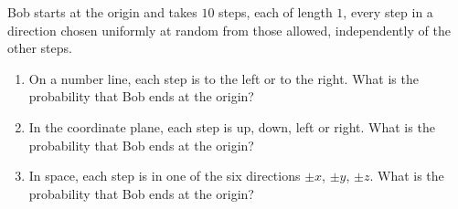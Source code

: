 Bob starts at the origin and takes $10$ steps, each of length $1$, every step in a direction chosen uniformly at random from those allowed, independently of the other steps.
\begin{enumerate}
\item[(a)] On a number line, each step is to the left or to the right. What is the probability that Bob ends at the origin?
\item[(b)] In the coordinate plane, each step is up, down, left or right. What is the probability that Bob ends at the origin?
\item[(c)] In space, each step is in one of the six directions $\pm x$, $\pm y$, $\pm z$. What is the probability that Bob ends at the origin?
\end{enumerate}
